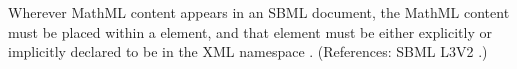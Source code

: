 Wherever MathML content appears in an SBML document, the MathML content
must be placed within a  element, and that  element
must be either explicitly or implicitly declared to be in the XML namespace
.  (References: SBML L3V2
.) 
